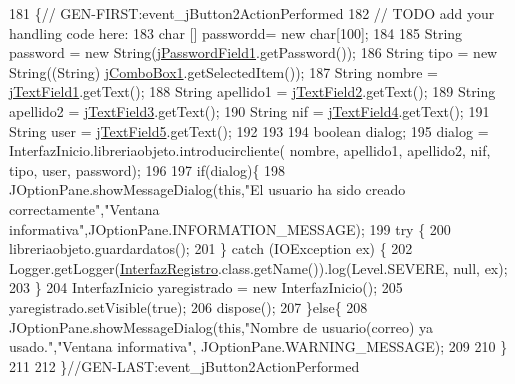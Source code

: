 \begin{DoxyCode}
181                                                                          \{\textcolor{comment}{//
      GEN-FIRST:event\_jButton2ActionPerformed}
182         \textcolor{comment}{// TODO add your handling code here:}
183         \textcolor{keywordtype}{char} [] passwordd= \textcolor{keyword}{new} \textcolor{keywordtype}{char}[100];
184         
185         String password = \textcolor{keyword}{new} String(\mbox{\hyperlink{class_interfaz_package_1_1_interfaz_registro_af5d680c6a043e4e0a96fa3b93ad17cf0}{jPasswordField1}}.getPassword());
186         String tipo = \textcolor{keyword}{new} String((String) \mbox{\hyperlink{class_interfaz_package_1_1_interfaz_registro_a4c0ea8d0c8cbb3225b39b115bbd0416b}{jComboBox1}}.getSelectedItem());
187         String nombre = \mbox{\hyperlink{class_interfaz_package_1_1_interfaz_registro_a19ed9a68b571a55582801c1726af9b06}{jTextField1}}.getText();
188         String apellido1 = \mbox{\hyperlink{class_interfaz_package_1_1_interfaz_registro_a999435bfad451715c3e32330d21be7bb}{jTextField2}}.getText();
189         String apellido2 = \mbox{\hyperlink{class_interfaz_package_1_1_interfaz_registro_a053413f2ec138bbb7914f22521b998f2}{jTextField3}}.getText();
190         String nif = \mbox{\hyperlink{class_interfaz_package_1_1_interfaz_registro_ac390d7bd629d29d59202c8b4fd60f46c}{jTextField4}}.getText();
191         String user = \mbox{\hyperlink{class_interfaz_package_1_1_interfaz_registro_ad0d4eb99969584d92b6b857ad190d210}{jTextField5}}.getText();
192         
193         
194         \textcolor{keywordtype}{boolean} dialog;
195         dialog = InterfazInicio.libreriaobjeto.introducircliente( nombre, apellido1, apellido2, nif, tipo, 
      user, password);
196         
197         \textcolor{keywordflow}{if}(dialog)\{
198             JOptionPane.showMessageDialog(\textcolor{keyword}{this},\textcolor{stringliteral}{"El usuario ha sido creado correctamente"},\textcolor{stringliteral}{"Ventana
       informativa"},JOptionPane.INFORMATION\_MESSAGE);
199             \textcolor{keywordflow}{try} \{
200                 libreriaobjeto.guardardatos();
201             \} \textcolor{keywordflow}{catch} (IOException ex) \{
202                 Logger.getLogger(\mbox{\hyperlink{class_interfaz_package_1_1_interfaz_registro_af44bbc6e1ad688d95cff640e7ce5a387}{InterfazRegistro}}.class.getName()).log(Level.SEVERE, null, 
      ex);
203             \}
204             InterfazInicio yaregistrado = \textcolor{keyword}{new} InterfazInicio();
205             yaregistrado.setVisible(\textcolor{keyword}{true});
206             dispose();
207         \}\textcolor{keywordflow}{else}\{
208             JOptionPane.showMessageDialog(\textcolor{keyword}{this},\textcolor{stringliteral}{"Nombre de usuario(correo) ya usado."},\textcolor{stringliteral}{"Ventana informativa"},
      JOptionPane.WARNING\_MESSAGE);
209 
210         \}
211         
212     \}\textcolor{comment}{//GEN-LAST:event\_jButton2ActionPerformed}
\end{DoxyCode}
